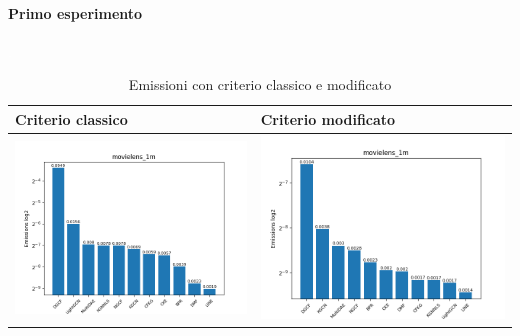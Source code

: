 \paragraph{Primo esperimento} \textcolor{white}{.} \\
\begin{table}[H]
    \centering
    \footnotesize
    \setlength\tabcolsep{0pt}
    \begin{tabularx}{\textwidth}{|X|X|}
        \hline
        \textbf{Criterio classico} & \textbf{Criterio modificato} \\
        \hline
        \includegraphics[width=\linewidth, trim=0 0 0 0]{images/emissions_movielens_1m_40_5_earlyClassic.png} &
        \includegraphics[width=\linewidth, trim=0 0 0 0]{images/emissions_movielens_1m_40_5_earlyModified.png} \\
        \hline
    \end{tabularx}
    \caption{Emissioni con criterio classico e modificato}
    \label{tab:emissions_info}
\end{table}



